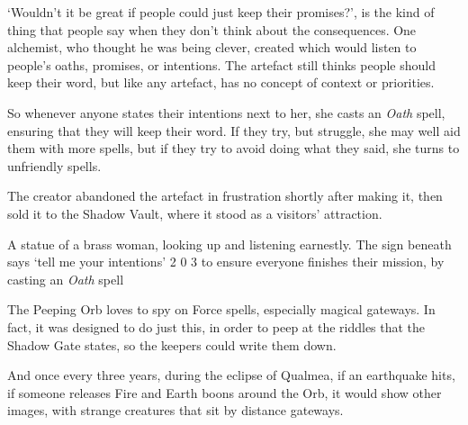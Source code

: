 

\begin{exampletext}
  `Wouldn't it be great if people could just keep their promises?', is the kind of thing that people say when they don't think about the consequences.
  One alchemist, who thought he was being clever, created  which would listen to people's oaths, promises, or intentions.
  The \gls{artefact} still thinks people should keep their word, but like any \gls{artefact}, has no concept of context or priorities.

  So whenever anyone states their intentions next to her, she casts an \textit{Oath} spell, ensuring that they will keep their word.
  If they try, but struggle, she may well aid them with more spells, but if they try to avoid doing what they said, she turns to unfriendly spells.

  The creator abandoned the \gls{artefact} in frustration shortly after making it, then sold it to the Shadow Vault, where it stood as a visitors' attraction.
\end{exampletext}

  {A statue of a brass woman, looking up and listening earnestly.
  The sign beneath says `tell me your intentions'}%
  {2}%
  {0}%
  {3}%
  {to ensure everyone finishes their mission, by casting an \textit{Oath} spell}%
  {
    \setcounter{Fate}{2}
    \setcounter{Water}{2}
    \setcounter{Empathy}{2}
    \setcounter{Wyldcrafting}{1}
  }%

\showStdSpells[
  \setcounter{diceNo}{0}
]




\begin{exampletext}
  The Peeping Orb loves to spy on Force spells, especially magical gateways.
  In fact, it was designed to do just this, in order to peep at the riddles that the Shadow Gate states, so the keepers could write them down.

  And once every three years, during the eclipse of Qualmea,%
  if an earthquake hits, if someone releases Fire and Earth \glspl{boon} around the Orb, it would show other images, with strange creatures that sit by distance gateways.
\end{exampletext}

